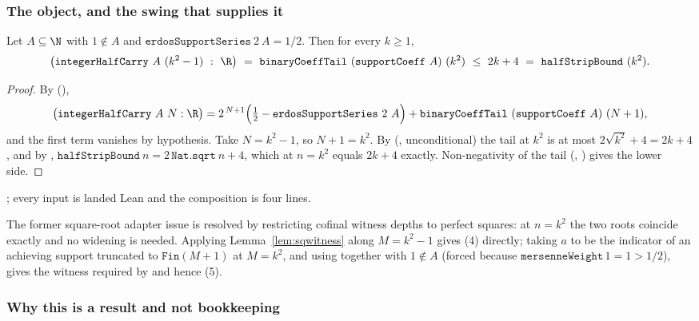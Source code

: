 \subsubsection*{The object, and the swing that supplies it}

\begin{lem}
\label{lem:sqwitness}
Let $A\subseteq\N$ with $1\notin A$ and $\mathtt{erdosSupportSeries}\ 2\ A=1/2$. Then for every
$k\ge1$,
\[
\bigl(\mathtt{integerHalfCarry}\ A\ (k^{2}-1)\ :\ \R\bigr)
\ =\ \mathtt{binaryCoeffTail}\ (\mathtt{supportCoeff}\ A)\ (k^{2})
\ \le\ 2k+4\ =\ \mathtt{halfStripBound}\ (k^{2}).
\]
\end{lem}
\begin{proof}
By  (),
\[
\bigl(\mathtt{integerHalfCarry}\ A\ N:\R\bigr)
= 2^{\,N+1}\Bigl(\tfrac12-\mathtt{erdosSupportSeries}\ 2\ A\Bigr)
+\mathtt{binaryCoeffTail}\ (\mathtt{supportCoeff}\ A)\ (N+1),
\]
and the first term vanishes by hypothesis. Take $N=k^{2}-1$, so $N+1=k^{2}$. By
 (,
unconditional) the tail at $k^2$ is at most $2\sqrt{k^{2}}+4=2k+4$, and by
, $\mathtt{halfStripBound}\ n
= 2\,\mathtt{Nat.sqrt}\ n+4$, which at $n=k^{2}$ equals $2k+4$ exactly. Non-negativity of the tail
(, ) gives the lower side.
\end{proof}
; every input is landed Lean and the composition is four lines.

The former square-root adapter issue is resolved by restricting cofinal witness depths to perfect
squares: at $n=k^{2}$ the two roots coincide
exactly and no widening is needed. Applying Lemma~\ref{lem:sqwitness} along $M=k^{2}-1$ gives (4)
directly; taking $a$ to be the indicator of an achieving support truncated to
$\mathtt{Fin}(M+1)$ at $M=k^{2}$, and using
 together with
$1\notin A$ (forced because $\mathtt{mersenneWeight}\,1=1>1/2$), gives the witness required by
 and hence (5).

\subsubsection*{Why this is a result and not bookkeeping}

